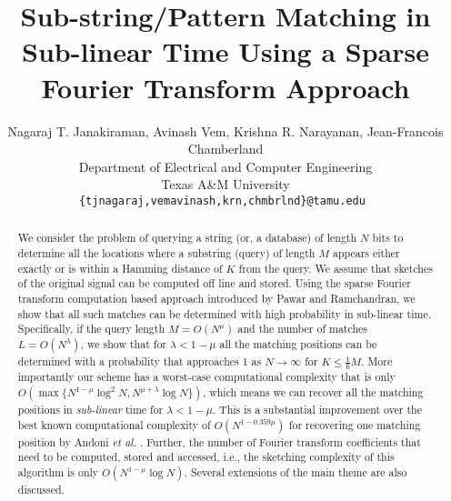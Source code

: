 \documentclass[journal,11pt,draftcls,onecolumn]{IEEEtran}
\begin{document}
\title{Sub-string/Pattern Matching in Sub-linear Time Using a Sparse Fourier Transform Approach}

\author{Nagaraj T. Janakiraman, Avinash Vem, Krishna R. Narayanan, Jean-Francois Chamberland\\
Department of Electrical and Computer Engineering \\
Texas A\&M University\\
{\tt\small {\{tjnagaraj,vemavinash,krn,chmbrlnd\}@tamu.edu} }}
	\maketitle

\begin{abstract}
	We consider the problem of querying a string (or, a database) of length $N$ bits to determine all the locations where a substring (query) of length $M$ appears either exactly or is within a Hamming distance of $K$ from the query. We assume that sketches of the original signal can be computed off line and stored. Using the sparse Fourier transform computation based approach introduced by Pawar and Ramchandran, we show that all such matches can be determined with high probability in sub-linear time. Specifically, if the query length $M = O(N^\mu)$ and the number of matches $L=O(N^\lambda)$, we show that for $\lambda < 1-\mu$ all the matching positions can be determined with a probability that approaches 1 as $N \rightarrow \infty$ for $K \leq \frac{1}{6}M$. More importantly our scheme has a worst-case computational complexity that is only $O\left(\max\{N^{1-\mu}\log^2 N, N^{\mu+\lambda}\log N \}\right)$, which means we can recover all the matching positions in {\it sub-linear} time for $\lambda<1-\mu$. This is a substantial improvement over the best known computational complexity of $O\left(N^{1-0.359 \mu} \right)$ for recovering one matching position by Andoni {\em et al.} \cite{andoni2013shift}. Further, the number of Fourier transform coefficients that need to be computed, stored and accessed, i.e., the sketching complexity of this algorithm is only $O\left(N^{1-\mu}\log N\right)$. Several extensions of the main theme are also discussed.
\end{abstract}









%




\end{document}
